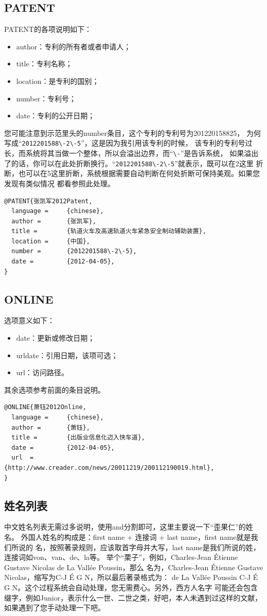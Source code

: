 \subsection{PATENT}
PATENT的各项说明如下：
\begin{itemize}
\itemsep=0pt \parskip=0pt
  \item author：专利的所有者或者申请人；
  \item title：专利名称；
  \item location：是专利的国别；%
  \item number：专利号；
  \item date：专利的公开日期；
\end{itemize}
您可能注意到示范里头的number条目，这个专利的专利号为201220158825，%
为何写成“\verb"2012201588\-2\-5"”，这是因为我引用该专利的时候，%
该专利的专利号过长，而系统将其当做一个整体，所以会溢出边界，而“\verb"\-"”是告诉系统，%
如果溢出了的话，你可以在此处折断换行。“\verb"2012201588\-2\-5"”就表示，既可以在2这里%
折断，也可以在5这里折断，系统根据需要自动判断在何处折断可保持美观。如果您发现有类似情况%
都看参照此处理。
\begin{Verbatim}[]
@PATENT{张凯军2012Patent,
  language =     {chinese},
  author =       {张凯军},
  title =        {轨道火车及高速轨道火车紧急安全制动辅助装置},
  location =     {中国},
  number =       {2012201588\-2\-5},
  date =         {2012-04-05},
}
\end{Verbatim}


\subsection{ONLINE}
选项意义如下：
\begin{itemize}
\itemsep=0pt \parskip=0pt
  \item date：更新或修改日期；
  \item urldate：引用日期，该项可选；%
  \item url：访问路径。
\end{itemize}
其余选项参考前面的条目说明。
\begin{Verbatim}[]
@ONLINE{萧钰2012Online,
  language =     {chinese},
  author =       {萧钰},
  title =        {出版业信息化迈入快车道},
  date =         {2012-04-05},
  url  =         {http://www.creader.com/news/20011219/200112190019.html},
}
\end{Verbatim}


\subsection{姓名列表}
中文姓名列表无需过多说明，使用and分割即可，这里主要说一下“歪果仁”的姓名。%
外国人姓名的构成是：first name + 连接词 + last name，first name就是我们所说的%
名，按照著录规则，应该取首字母并大写，last name是我们所说的姓，连接词如von、van、de、la等。%
举个“栗子”，例如，Charles-Jean Étienne Gustave Nicolas de La Vallée Poussin，那么%
名为，Charles-Jean Étienne Gustave Nicolas，缩写为C-J É G N，所以最后著录格式为：
de La Vallée Poussin C-J É G N。这个过程系统会自动处理，您无需费心。另外，西方人名字%
可能还会包含缀字，例如Junior，表示什么一世、二世之类，好吧，本人未遇到过这样的文献，%
如果遇到了您手动处理一下吧。

